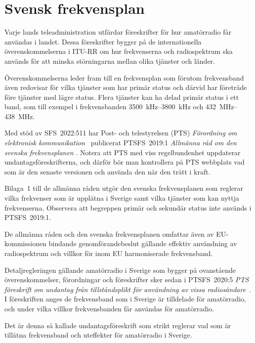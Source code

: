 \chapter{Svensk frekvensplan}
\label{svensk frekvensplan}

Varje lands teleadministration utfärdar föreskrifter för hur amatörradio får
användas i landet.
Dessa föreskrifter bygger på de internationella överenskommelserna i ITU-RR
\cite[ARTICLE 5]{ITU-RR} om hur frekvenserna och radiospektrum ska används för
att minska störningarna mellan olika tjänster och länder.

Överenskommelserna leder fram till en frekvensplan som förutom frekvensband även
redovisar för vilka tjänster som har primär status och därvid har företräde före
tjänster med lägre status.
Flera tjänster kan ha delad primär status i ett band, som till exempel i
frekvensbanden \SIrange{3500}{3800}{\kilo\hertz} och
\SIrange{432}{438}{\mega\hertz}.

Med stöd av SFS~2022:511 har Post- och telestyrelsen (PTS)
\emph{Förordning om elektronisk kommunikation}~\cite{SFS2022:511}
publicerat PTSFS~2019:1 \emph{Allmänna råd om den svenska frekvensplanen}
\cite{PTSFS2019:1}.
Notera att PTS med viss regelbundenhet uppdaterar undantagsföreskrifterna,
och därför bör man kontrollera på PTS webbplats vad som är den senaste versionen
och använda den när den trätt i kraft.

Bilaga~1 till de allmänna råden utgör den svenska frekvensplanen som reglerar
vilka frekvenser som är upplåtna i Sverige samt vilka tjänster som kan nyttja
frekvenserna.
Observera att begreppen primär och sekundär status inte används i PTSFS~2019:1.

De allmänna råden och den svenska frekvensplanen omfattar även av
EU-kommissionen bindande genomförandebeslut gällande effektiv användning av
radiospektrum och villkor för inom EU harmoniserade frekvensband.

\newpage

Detaljregleringen gällande amatörradio i Sverige som bygger på ovanstående
överenskommelser, förordningar och föreskrifter sker sedan i PTSFS~2020:5
\emph{PTS föreskrift om undantag från tillståndsplikt för användning av vissa
  radiosändare}~\cite{PTSFS2022:19}.
I föreskriften anges de frekvensband som i Sverige är tilldelade för
amatörradio, och under vilka villkor frekvensbanden får användas för
amatörradio.

Det är denna så kallade undantagsföreskrift som strikt reglerar vad som är
tillåtna frekvensband och uteffekter för amatörradio i Sverige.

